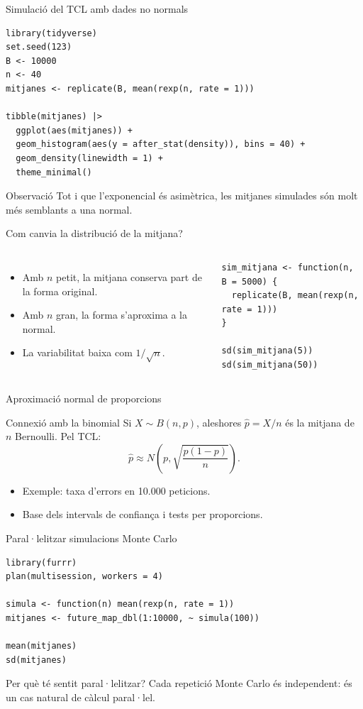 \documentclass[10pt,aspectratio=169]{beamer}
\begin{document}
\begin{frame}[fragile]{Simulació del TCL amb dades no normals}
\begin{lstlisting}
library(tidyverse)
set.seed(123)
B <- 10000
n <- 40
mitjanes <- replicate(B, mean(rexp(n, rate = 1)))

tibble(mitjanes) |>
  ggplot(aes(mitjanes)) +
  geom_histogram(aes(y = after_stat(density)), bins = 40) +
  geom_density(linewidth = 1) +
  theme_minimal()
\end{lstlisting}
\begin{block}{Observació}
Tot i que l'exponencial és asimètrica, les mitjanes simulades són molt més semblants a una normal.
\end{block}
\end{frame}

\begin{frame}[fragile]{Com canvia la distribució de la mitjana?}
\begin{columns}[T]
\begin{itemize}
  \item Amb $n$ petit, la mitjana conserva part de la forma original.
  \item Amb $n$ gran, la forma s'aproxima a la normal.
  \item La variabilitat baixa com $1/\sqrt n$.
\end{itemize}
\begin{lstlisting}
sim_mitjana <- function(n, B = 5000) {
  replicate(B, mean(rexp(n, rate = 1)))
}

sd(sim_mitjana(5))
sd(sim_mitjana(50))
\end{lstlisting}
\end{columns}
\end{frame}

\begin{frame}[fragile]{Aproximació normal de proporcions}
\begin{block}{Connexió amb la binomial}
Si $X\sim B(n,p)$, aleshores $\hat p=X/n$ és la mitjana de $n$ Bernoulli.
Pel TCL:
\[
\hat p \approx N\left(p,\sqrt{\frac{p(1-p)}{n}}\right).
\]
\end{block}
\begin{itemize}
  \item Exemple: taxa d'errors en 10.000 peticions.
  \item Base dels intervals de confiança i tests per proporcions.
\end{itemize}
\end{frame}

\begin{frame}[fragile]{Paral·lelitzar simulacions Monte Carlo}
\begin{lstlisting}
library(furrr)
plan(multisession, workers = 4)

simula <- function(n) mean(rexp(n, rate = 1))
mitjanes <- future_map_dbl(1:10000, ~ simula(100))

mean(mitjanes)
sd(mitjanes)
\end{lstlisting}
\begin{alertblock}{Per què té sentit paral·lelitzar?}
Cada repetició Monte Carlo és independent: és un cas natural de càlcul paral·lel.
\end{alertblock}
\end{frame}
\end{document}
